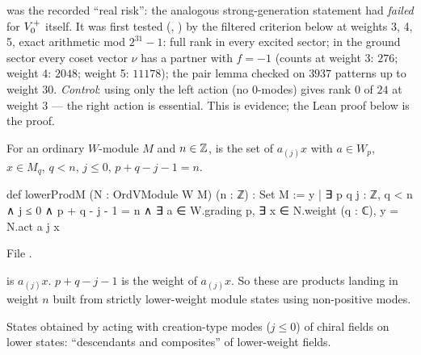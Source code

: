 \begin{warning}[title={Evidence: Numerical de-risking before formalisation}]
 was the recorded ``real risk'': the analogous strong-generation statement had
\emph{failed} for $V_0^{+}$ itself.  It was first tested (,
) by the filtered criterion below at weights 3, 4, 5, exact
arithmetic mod $2^{31}-1$: full rank in every excited sector; in the ground sector every coset vector
$\nu$ has a partner with $f=-1$ (counts at weight 3: $276$; weight 4: $2048$; weight 5: $11178$); the pair
lemma checked on $3937$ patterns up to weight $30$.  \emph{Control}: using only the left action
(no $0$-modes) gives rank $0$ of $24$ at weight $3$ — the right action is essential.  This is evidence;
the Lean proof below is the proof.
\end{warning}

\begin{definition}\label{ch14:def:lowerprod}
For an ordinary $W$-module $M$ and $n\in{\mathbb{Z}}$,  is the set of $a_{(j)}x$ with $a\in W_p$,
$x\in M_q$, $q<n$, $j\le0$, $p+q-j-1=n$.
\end{definition}
\begin{leancode}
def lowerProdM (N : OrdVModule W M) (n : ℤ) : Set M :=
  {y | ∃ p q j : ℤ, q < n ∧ j ≤ 0 ∧ p + q - j - 1 = n ∧
    ∃ a ∈ W.grading p, ∃ x ∈ N.weight (q : ℂ), y = N.act a j x}
\end{leancode}
File .

\begin{dictionary}
 is $a_{(j)}x$.  $p+q-j-1$ is the weight of $a_{(j)}x$.  So these are products landing in
weight $n$ built from strictly lower-weight module states using non-positive modes.
\end{dictionary}

\begin{physics}
States obtained by acting with creation-type modes ($j\le0$) of chiral fields on lower states:
``descendants and composites'' of lower-weight fields.
\end{physics}

